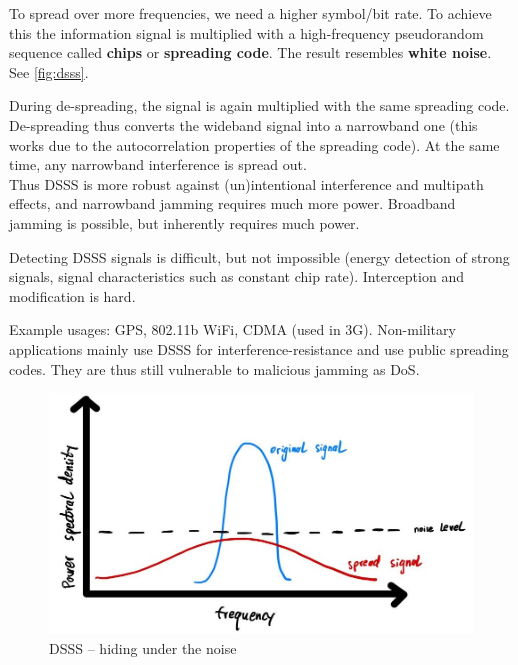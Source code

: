 To spread over more frequencies, we need a higher symbol/bit rate.
To achieve this the information signal is multiplied with a high-frequency pseudorandom sequence called \textbf{chips} or \textbf{spreading code}.
The result resembles \textbf{white noise}.
See \autoref{fig:dsss}.

During de-spreading, the signal is again multiplied with the same spreading code.
De-spreading thus converts the wideband signal into a narrowband one (this works due to the autocorrelation properties of the spreading code).
At the same time, any narrowband interference is spread out.
\\
Thus DSSS is more robust against (un)intentional interference and multipath effects, and narrowband jamming requires much more power.
Broadband jamming is possible, but inherently requires much power.

Detecting DSSS signals is difficult, but not impossible (energy detection of strong signals, signal characteristics such as constant chip rate).
Interception and modification is hard.

Example usages: GPS, 802.11b WiFi, CDMA (used in 3G).
Non-military applications mainly use DSSS for interference-resistance and use public spreading codes.
They are thus still vulnerable to malicious jamming as DoS.

\begin{figure}
	\centering
	\includegraphics[scale=0.4]{images/2-dsss-psd.jpg}
	\caption{DSSS -- hiding under the noise}
	\label{fig:dsss-psd}
\end{figure}

